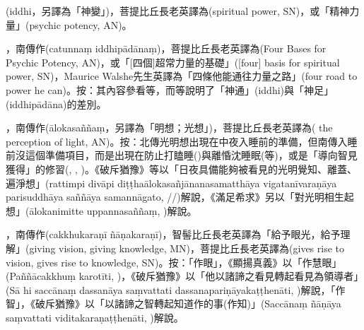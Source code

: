 \startitemgroup[noteitems]
\item{}(iddhi，另譯為「神變」)，菩提比丘長老英譯為(spiritual power, SN)，或「精神力量」(psychic potency, AN)。
\item{}，南傳作(catunnaṃ iddhipādānaṃ)，菩提比丘長老英譯為(Four Bases for Psychic Potency, AN)，或「[四個]超常力量的基礎」([four] basis for spiritual power, SN)，Maurice Walshe先生英譯為「四條他能通往力量之路」(four road to power he can)。按：其內容參看等，而等說明了「神通」(iddhi)與「神足」(iddhipādāna)的差別。
\stopitemgroup

\startitemgroup[noteitems]
\item{}，南傳作(ālokasaññaṃ，另譯為「明想；光想」)，菩提比丘長老英譯為( the perception of light, AN)。按：北傳光明想出現在中夜入睡前的準備，但南傳入睡前沒這個準備項目，而是出現在防止打瞌睡()與離惛沈睡眠(等)，或是「導向智見獲得」的修習(, , )。《破斥猶豫》等以「日夜具備能夠被看見的光明覺知、離蓋、遍淨想」(rattimpi divāpi diṭṭhaālokasañjānanasamatthāya vigatanīvaraṇāya parisuddhāya saññāya samannāgato, //)解說，《滿足希求》另以「對光明相生起想」(ālokanimitte uppannasaññaṃ, )解說。
\stopitemgroup

\startitemgroup[noteitems]
\item{}，南傳作(cakkhukaraṇī ñāṇakaraṇī)，智髻比丘長老英譯為「給予眼光，給予理解」(giving vision, giving knowledge, MN)，菩提比丘長老英譯為(gives rise to vision, gives rise to knowledge, SN)。按：「作眼」，《顯揚真義》以「作慧眼」(Paññācakkhuṃ karotīti, )，《破斥猶豫》以「他以諸諦之看見轉起看見為領導者」(Sā hi saccānaṃ dassanāya saṃvattati dassanapariṇāyakaṭṭhenāti, )解說，「作智」，《破斥猶豫》以「以諸諦之智轉起知道作的事(作知)」(Saccānaṃ ñāṇāya saṃvattati viditakaraṇaṭṭhenāti, )解說。
\stopitemgroup

